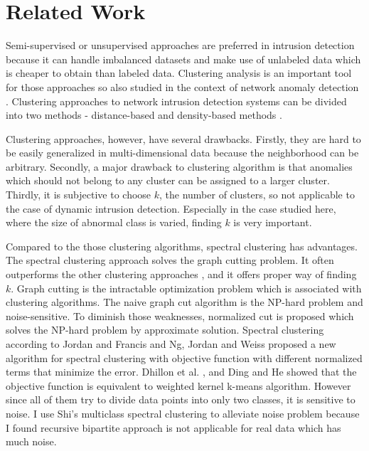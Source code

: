 \section{Related Work}
\label{sec:relatedwork}
Semi-supervised or unsupervised approaches are preferred in intrusion detection \cite{chandola09} because it can handle imbalanced datasets and make use of unlabeled data which is cheaper to obtain than labeled data.
Clustering analysis is an important tool for those approaches so also studied in the context of network anomaly detection \cite{chandola09}. 
Clustering approaches to network intrusion detection systems can be divided into two methods 
- distance-based \cite{ramaswamy00}\cite{knorr00} and density-based methods \cite{aggarwal01}\cite{breuning00}\cite{ester96}. 

Clustering approaches, however, have several drawbacks. 
Firstly, they are hard to be easily generalized in multi-dimensional data because the neighborhood can be arbitrary. 
Secondly, a major drawback to clustering algorithm is that anomalies which should not belong to any cluster can be assigned to a larger cluster. 
Thirdly, it is subjective to choose $k$, the number of clusters, so not applicable to the case of dynamic intrusion detection. 
Especially in the case studied here, where the size of abnormal class is varied, finding $k$ is very important. 

Compared to the those clustering algorithms, spectral clustering has advantages. 
The spectral clustering approach solves the graph cutting problem. 
It often outperforms the other clustering approaches \cite{ulrike07}, and it offers proper way of finding $k$. 
Graph cutting is the intractable optimization problem which is associated with clustering algorithms. 
The naive graph cut algorithm is the NP-hard problem and noise-sensitive. 
To diminish those weaknesses, normalized cut \cite{jianbo00} is proposed which solves the NP-hard problem by approximate solution. 
Spectral clustering according to Jordan and Francis \cite{jordan04} and Ng, Jordan and Weiss \cite{ng01} proposed a new algorithm for spectral clustering with objective function with different normalized terms that minimize the error. 
Dhillon et al. \cite{dhillon04}, and Ding and He \cite{cding04} showed that the objective function is equivalent to weighted kernel k-means algorithm.
However since all of them try to divide data points into only two classes, it is sensitive to noise.
I use Shi's multiclass spectral clustering \cite{jianbo03} to alleviate noise problem because I found recursive bipartite approach is not applicable for real data which has much noise. 

